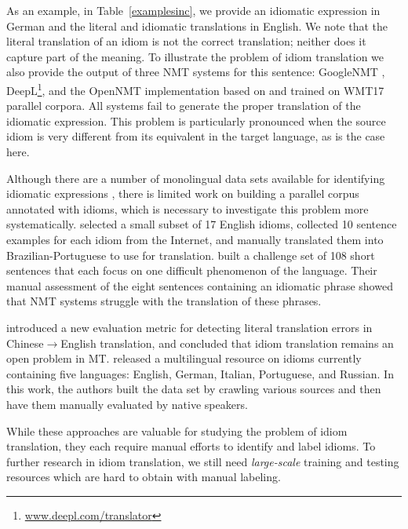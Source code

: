 As an example, in Table~\ref{examplesinc}, we provide an idiomatic expression in German and the literal and idiomatic translations in English.
We note that the literal translation of an idiom is not the correct translation; neither does it capture part of the meaning. 
To illustrate the problem of idiom translation we also provide the output of three
NMT systems for this sentence: GoogleNMT \citep{wu2016google}, DeepL\footnote{\url{www.deepl.com/translator}}, and the OpenNMT implementation \citep{2017opennmt} based on \citet{DBLP:journals/corr/BahdanauCB14} and \citet{luong:2015:EMNLP} trained on WMT17 parallel corpora. 
All systems fail to generate the proper translation of the idiomatic expression. 
This problem is particularly pronounced when the source idiom is very different from its equivalent in the target language, as is the case here.


Although there are a number of monolingual data sets available for identifying idiomatic expressions \citep{muzny2013automatic,markantonatou2017proceedings}, there is limited work on building a parallel corpus annotated with idioms, which is necessary to investigate this problem more systematically.  
\citet{salton-ross-kelleher:2014:HyTra} selected a small subset of 17 English idioms, collected 10 sentence examples for each idiom from the Internet, and manually translated them into Brazilian-Portuguese to use for translation.
\citet{isabelle2017challenge} built a challenge set of 108 short sentences that each focus on one difficult phenomenon of the language.
Their manual assessment of the eight sentences containing an idiomatic phrase showed that NMT systems struggle with the translation of these phrases.

\citet{shao-etal-2018-evaluating} introduced a new evaluation metric for detecting literal translation errors in Chinese$\rightarrow$English translation, and concluded that idiom translation remains an open problem in MT.
\citet{moussallem-etal-2018-lidioms} released a multilingual resource on idioms currently containing five languages: English, German, Italian, Portuguese, and Russian. In this work, the authors built the data set by crawling various sources and then have them manually evaluated by native speakers.

While these approaches are valuable for studying the problem of idiom translation, they each require manual efforts to identify and label idioms.
To further research in idiom translation, we still need \textit{large-scale} training and testing resources which are hard to obtain with manual labeling.  

